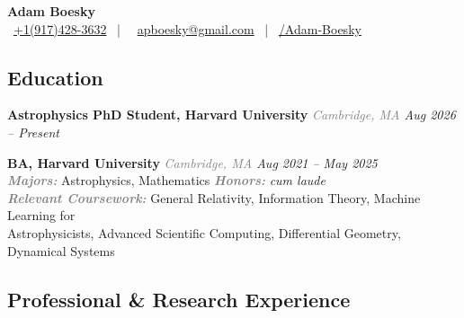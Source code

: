 \documentclass[12pt,letterpaper]{article}
\begin{document}
\thispagestyle{empty}\sloppy\sloppypar\raggedbottom

\begin{center}
      {\huge \textbf{Adam Boesky}}\\[0.5em]
      {\footnotesize
            \faPhoneSquare \ \href{tel:+1-917-428-3632}{+1(917)\hspace{0.075cm}428-3632}
            \ | \
            \faEnvelope \ \href{mailto:apboesky@gmail.com}{apboesky@gmail.com}
            \ | \
            \faGithub \href{https://github.com/Adam-Boesky}{/Adam-Boesky}
      }
  \end{center}

\subsection{Education}

\textbf{Astrophysics PhD Student, Harvard University} {\small\textit{\textcolor{gray}{Cambridge, MA} \hfill \textcolor{niceblue}{Aug 2026 -- Present}}}\\

\vspace{7pt}


\textbf{BA, Harvard University} {\small\textit{\textcolor{gray}{Cambridge, MA} \hfill \textcolor{niceblue}{Aug 2021 -- May 2025}}}\\
\quad \textcolor{gray}{\textbf{\textit{Majors:}}} Astrophysics, Mathematics \quad \textcolor{gray}{\textbf{\textit{Honors:}}} \textit{cum laude} \\
\quad \textcolor{gray}{\textbf{\textit{Relevant Coursework:}}} General Relativity, Information Theory, Machine Learning for \\
\quad \quad Astrophysicists, Advanced Scientific Computing, Differential Geometry, Dynamical Systems
 
\subsection{Professional \& Research Experience}
\end{document}
